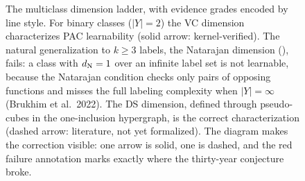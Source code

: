 \begin{figure}[ht]
\caption[The multiclass dimension ladder $\mathrm{StrongShattering} \le \Ndim \le \DSdim$.]{The
multiclass dimension ladder, with evidence grades encoded by line style. For binary classes
($|Y|=2$) the VC dimension characterizes PAC learnability (solid arrow: kernel-verified). The
natural generalization to $k \ge 3$ labels, the Natarajan dimension (),
fails: a class with $d_{\mathrm{N}} = 1$ over an infinite label set is not learnable, because the
Natarajan condition checks only pairs of opposing functions and misses the full labeling
complexity when $|Y| = \infty$ (Brukhim et al.\ 2022). The DS dimension, defined through
pseudo-cubes in the one-inclusion hypergraph, is the correct characterization (dashed arrow:
literature, not yet formalized). The diagram makes the correction visible: one arrow is
solid, one is dashed, and the red failure annotation marks exactly where the thirty-year
conjecture broke.}
\label{fig:dimension-hierarchy}
\end{figure}



